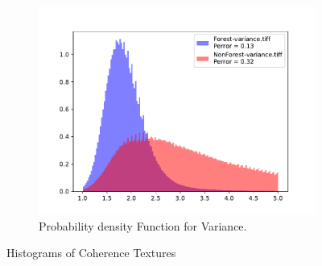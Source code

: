 \begin{figure}[H]
  \centering
  \begin{subfigure}[b]{0.4\linewidth}
    \includegraphics[width=\linewidth]{Chapter5/SENTINEL1/Coherence/variance_histogram.pdf}
     \caption{Probability density Function for Variance.}
  \end{subfigure}
  \caption{Histograms of Coherence Textures}
  \label{fig: sentinel_coherence_hist}
\end{figure}
\newpage


